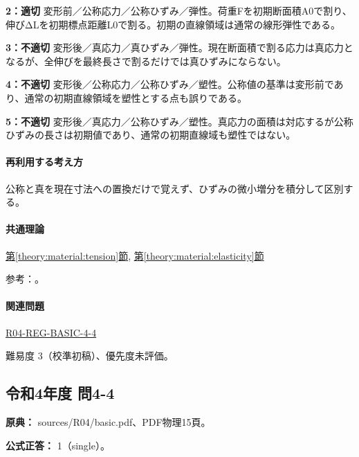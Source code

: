 \noindent\textbf{2：適切} 変形前／公称応力／公称ひずみ／弾性。荷重Fを初期断面積A0で割り、伸びΔLを初期標点距離L0で割る。初期の直線領域は通常の線形弾性である。\par

\noindent\textbf{3：不適切} 変形後／真応力／真ひずみ／弾性。現在断面積で割る応力は真応力となるが、全伸びを最終長さで割るだけでは真ひずみにならない。\par

\noindent\textbf{4：不適切} 変形後／公称応力／公称ひずみ／塑性。公称値の基準は変形前であり、通常の初期直線領域を塑性とする点も誤りである。\par

\noindent\textbf{5：不適切} 変形後／真応力／公称ひずみ／塑性。真応力の面積は対応するが公称ひずみの長さは初期値であり、通常の初期直線域も塑性ではない。\par

\paragraph{再利用する考え方} 公称と真を現在寸法への置換だけで覚えず、ひずみの微小増分を積分して区別する。

\paragraph{共通理論} \hyperref[theory:material:tension]{第\ref*{theory:material:tension}節}, \hyperref[theory:material:elasticity]{第\ref*{theory:material:elasticity}節}

\par 参考：\cite{mit_material_stressstrain2001,mit_material_elastic2000}。

\paragraph{関連問題} \hyperref[q:r04-reg-basic-4-4]{R04-REG-BASIC-4-4}

\par 難易度 3（校準初稿）、優先度未評価。

\subsection{令和4年度 問4-4}
\label{q:r04-reg-basic-4-4}

\noindent\textbf{原典：} sources/R04/basic.pdf、PDF物理15頁。

\textbf{公式正答：} 1（single）。

